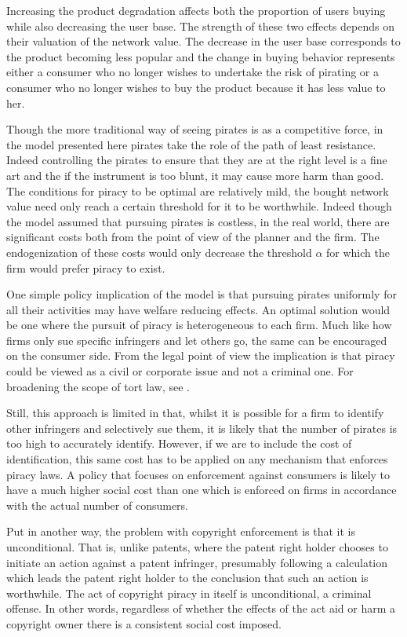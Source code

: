 Increasing the product degradation affects both the proportion of users buying while also decreasing the user base. The strength of these two effects depends on their valuation of the network value. The decrease in the user base corresponds to the product becoming less popular and the change in buying behavior represents either a consumer who no longer wishes to undertake the risk of pirating or a consumer who no longer wishes to buy the product because it has less value to her.

Though the more traditional way of seeing pirates is as a competitive force, in the model presented here pirates take the role of the path of least resistance. Indeed controlling the pirates to ensure that they are at the right level is a fine art and the if the instrument is too blunt, it may cause more harm than good. The conditions for piracy to be optimal are relatively mild, the bought network value need only reach a certain threshold for it to be worthwhile. Indeed though the model assumed that pursuing pirates is costless, in the real world, there are significant costs both from the point of view of the planner and the firm. The endogenization of these costs would only decrease the threshold $\alpha$ for which the firm would prefer piracy to exist.

One simple policy implication of the model is that pursuing pirates uniformly for all their activities may have welfare reducing effects. An optimal solution would be one where the pursuit of piracy is  heterogeneous to each firm. Much like how firms only sue specific infringers and let others go, the same can be encouraged on the consumer side. From the legal point of view the implication is that piracy could be viewed as a civil or corporate issue and not a criminal one. For broadening the scope of tort law, see \citep{DF96}. 

Still, this approach is limited in that, whilst it is possible for a firm to identify other infringers and selectively sue them, it is likely that the number of pirates is too high to accurately identify. However, if we are to include the cost of identification, this same cost has to be applied on any mechanism that enforces piracy laws. A policy that focuses on enforcement against consumers is likely to have a much higher social cost than one which is enforced on firms in accordance with the actual number of consumers. 

Put in another way, the problem with copyright enforcement is that it is unconditional. That is, unlike patents, where the patent right holder chooses to initiate an action against a patent infringer, presumably following a calculation which leads the patent right holder to the conclusion that such an action is worthwhile. The act of copyright piracy in itself is unconditional, a criminal offense. In other words, regardless of whether the effects of the act aid or harm a copyright owner there is a consistent social cost imposed. 

